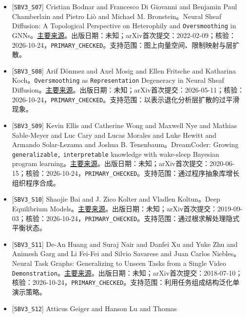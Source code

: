 \documentclass[
  10pt,
]{article}
\begin{document}
\begin{itemize}
  \nolinkurl{Convolutional} Networks and the Icosahedral
  CNN。\href{https://arxiv.org/abs/1902.04615}{主要来源}。出版日期：未知；arXiv首次提交：2019-02-11；核验：2026-10-24，\nolinkurl{PRIMARY_CHECKED}。支持范围：局部规范变换下的等变网络构造原则。
\item
  {[}\nolinkurl{SBV3_S07}{]} Cristian Bodnar and Francesco Di Giovanni
  and Benjamin Paul Chamberlain and Pietro Liò and Michael M.
  Bronstein。Neural Sheaf Diffusion: A Topological Perspective on
  Heterophily and \nolinkurl{Oversmoothing} in
  GNNs。\href{https://arxiv.org/abs/2202.04579}{主要来源}。出版日期：未知；arXiv首次提交：2022-02-09；核验：2026-10-24，\nolinkurl{PRIMARY_CHECKED}。支持范围：图上向量空间、限制映射与层扩散。
\item
  {[}\nolinkurl{SBV3_S08}{]} Arif Dönmez and Axel Mosig and Ellen
  Fritsche and Katharina Koch。\nolinkurl{Oversmoothing} as
  \nolinkurl{Representation} Degeneracy in Neural Sheaf
  Diffusion。\href{https://arxiv.org/abs/2605.11178}{主要来源}。出版日期：未知；arXiv首次提交：2026-05-11；核验：2026-10-24，\nolinkurl{PRIMARY_CHECKED}。支持范围：以表示退化分析层扩散的过平滑现象。
\item
  {[}\nolinkurl{SBV3_S09}{]} Kevin Ellis and Catherine Wong and Maxwell
  Nye and Mathias Sable-Meyer and Luc Cary and Lucas Morales and Luke
  Hewitt and Armando Solar-Lezama and Joshua B. Tenenbaum。DreamCoder:
  Growing \nolinkurl{generalizable,} \nolinkurl{interpretable} knowledge
  with wake-sleep Bayesian program
  learning。\href{https://arxiv.org/abs/2006.08381}{主要来源}。出版日期：未知；arXiv首次提交：2020-06-15；核验：2026-10-24，\nolinkurl{PRIMARY_CHECKED}。支持范围：通过程序抽象库增长组织程序合成。
\item
  {[}\nolinkurl{SBV3_S10}{]} Shaojie Bai and J. Zico Kolter and Vladlen
  Koltun。Deep Equilibrium
  Models。\href{https://arxiv.org/abs/1909.01377}{主要来源}。出版日期：未知；arXiv首次提交：2019-09-03；核验：2026-10-24，\nolinkurl{PRIMARY_CHECKED}。支持范围：通过根求解处理隐式平衡状态。
\item
  {[}\nolinkurl{SBV3_S11}{]} De-An Huang and Suraj Nair and Danfei Xu
  and Yuke Zhu and Animesh Garg and Li Fei-Fei and Silvio Savarese and
  Juan Carlos Niebles。Neural Task Graphs: Generalizing to Unseen Tasks
  from a Single Video
  \nolinkurl{Demonstration}。\href{https://arxiv.org/abs/1807.03480}{主要来源}。出版日期：未知；arXiv首次提交：2018-07-10；核验：2026-10-24，\nolinkurl{PRIMARY_CHECKED}。支持范围：利用任务组成结构泛化单演示策略。
\item
  {[}\nolinkurl{SBV3_S12}{]} Atticus Geiger and Hanson Lu and Thomas

\end{itemize}
\end{document}
